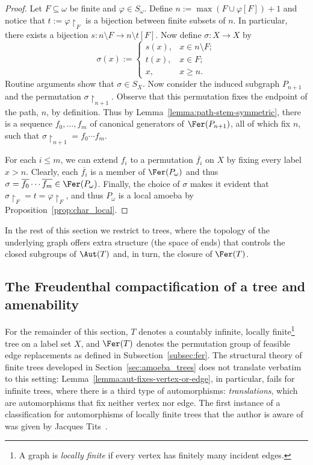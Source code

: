 \begin{proof}
    Let $F\subseteq\omega$ be finite and $\varphi\in S_\omega$.
    Define $n:=\max(F\cup\varphi[F])+1$ and notice that $t:=\varphi\restriction_F$ is a bijection between finite subsets of $n$.
    In particular, there exists a bijection $s\colon n\setminus F\to n\setminus t[F]$.
    Now define $\sigma\colon X\to X$ by $$\sigma(x):=\begin{cases}
        s(x),&x\in n\setminus F;\\
        t(x),&x\in F;\\
        x,&x\geq n.
    \end{cases}$$ Routine arguments show that $\sigma\in S_X$.
    Now consider the induced subgraph $P_{n+1}$ and the permutation $\sigma\restriction_{n+1}$.
    Observe that this permutation fixes the endpoint of the path, $n$, by definition.
    Thus by Lemma~\ref{lemma:path-stem-symmetric}, there is a sequence $f_0,\dots,f_m$ of canonical generators of $\Fer(P_{n+1})$, all of which fix $n$, such that $\sigma\restriction_{n+1}=f_0\cdots f_m$.

    For each $i\leq m$, we can extend $f_i$ to a permutation $\overline{f_i}$ on $X$ by fixing every label $x>n$.
    Clearly, each $\overline{f_i}$ is a member of $\Fer(P_\omega)$ and thus $\sigma=\overline{f_0}\cdots\overline{f_m}\in\Fer(P_\omega)$.
    Finally, the choice of $\sigma$ makes it evident that $\sigma\restriction_F=t=\varphi\restriction_F$, and thus $P_\omega$ is a local amoeba by Proposition~\ref{prop:char_local}.
\end{proof}

In the rest of this section we restrict to trees, where the topology of the underlying graph offers extra structure (the space of ends) that controls the closed subgroups of $\Aut(T)$ and, in turn, the closure of $\Fer(T)$.

\subsection{The Freudenthal compactification of a tree and amenability}\label{subsec:freudenthal}

For the remainder of this section, $T$ denotes a countably infinite, locally finite\footnote{A graph is \emph{locally finite} if every vertex has finitely many incident edges.} tree on a label set $X$, and $\Fer(T)$ denotes the permutation group of feasible edge replacements as defined in Subsection~\ref{subsec:fer}.
The structural theory of finite trees developed in Section~\ref{sec:amoeba_trees} does not translate verbatim to this setting: Lemma~\ref{lemma:aut-fixes-vertex-or-edge}, in particular, fails for infinite trees, where there is a third type of automorphisms: \emph{translations}, which are automorphisms that fix neither vertex nor edge.
The first instance of a classification for automorphisms of locally finite trees that the author is aware of was given by Jacques Tits~\cite{Tits_1970_AutT}.

